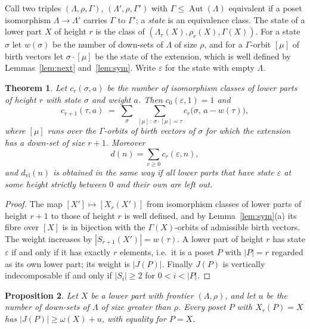 \documentclass[11pt]{amsart}
\newtheorem{theorem}{Theorem}[section]
\newtheorem{proposition}[theorem]{Proposition}
\theoremstyle{definition}
\theoremstyle{remark}
\newcommand{\Aut}{\operatorname{Aut}}
\begin{document}
Call two triples $(\Lambda,\rho,\Gamma)$, $(\Lambda',\rho,\Gamma')$ with
$\Gamma \le \Aut(\Lambda)$ equivalent if a poset isomorphism $\Lambda \to \Lambda'$
carries $\Gamma$ to $\Gamma'$; a \emph{state} is an equivalence class.  The state of a
lower part $X$ of height $r$ is the class of
$(\Lambda_r(X),\rho_r(X),\Gamma(X))$.  For a state $\sigma$ let $w(\sigma)$ be the
number of down-sets of $\Lambda$ of size $\rho$, and for a $\Gamma$-orbit $[\mu]$ of
birth vectors let $\sigma \cdot [\mu]$ be the state of the extension, which is well
defined by Lemmas~\ref{lem:next} and~\ref{lem:sym}.  Write $\varepsilon$ for the state
with empty $\Lambda$.

\begin{theorem}\label{thm:dist}
Let $c_r(\sigma,a)$ be the number of isomorphism classes of lower parts of height $r$
with state $\sigma$ and weight $a$.  Then $c_0(\varepsilon,1)=1$ and
\[
  c_{r+1}(\tau,a) \;=\; \sum_{\sigma}\ \sum_{[\mu]\,:\,\sigma\cdot[\mu]=\tau}
     c_r\bigl(\sigma,\,a - w(\tau)\bigr),
\]
where $[\mu]$ runs over the $\Gamma$-orbits of birth vectors of $\sigma$ for which the
extension has a down-set of size $r+1$.  Moreover
\[
  d(n) = \sum_{r \ge 0} c_r(\varepsilon,n) ,
\]
and $d_{\mathrm{vi}}(n)$ is obtained in the same way if all lower parts that have state
$\varepsilon$ at some height strictly between $0$ and their own are left out.
\end{theorem}

\begin{proof}
The map $[X'] \mapsto [X_r(X')]$ from isomorphism classes of lower parts of height
$r+1$ to those of height $r$ is well defined, and by Lemma~\ref{lem:sym}(a) its fibre
over $[X]$ is in bijection with the $\Gamma(X)$-orbits of admissible birth vectors.  The
weight increases by $|S_{r+1}(X')| = w(\tau)$.  A lower part of height $r$ has state
$\varepsilon$ if and only if it has exactly $r$ elements, i.e.\ it is a poset $P$ with
$|P| = r$ regarded as its own lower part; its weight is $|J(P)|$.  Finally $J(P)$ is
vertically indecomposable if and only if $|S_i| \ge 2$ for $0 < i < |P|$.
\end{proof}

\begin{proposition}\label{prop:bound}
Let $X$ be a lower part with frontier $(\Lambda,\rho)$, and let $u$ be the number of
down-sets of $\Lambda$ of size greater than $\rho$.  Every poset $P$ with $X_r(P) = X$
has $|J(P)| \ge \omega(X) + u$, with equality for $P = X$.
\end{proposition}
\end{document}
